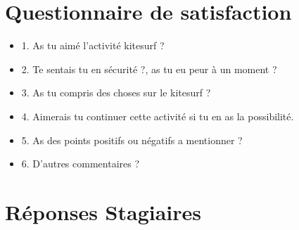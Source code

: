 \documentclass[11pt,a4paper]{report}
\begin{document}
\appendix
\appendixpage
\addappheadtotoc
\chapter{Questionnaire de satisfaction\label{questionnaire}}
\begin{itemize}
\item 1. As tu aimé l'activité kitesurf ?
\item 2. Te sentais tu en sécurité ?, as tu eu peur à un moment ?
\item 3. As tu compris des choses sur le kitesurf ?
\item 4. Aimerais tu continuer cette activité si tu en as la possibilité.
\item 5. As des points positifs ou négatifs a mentionner ?
\item 6. D'autres commentaires ?
\end{itemize}

\chapter{Réponses Stagiaires\label{reponses}}
\end{document}
